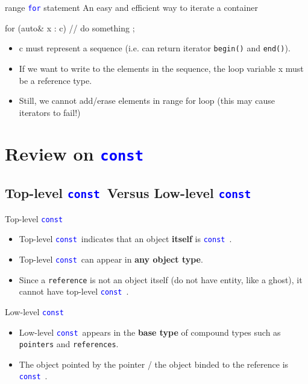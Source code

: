 \documentclass{beamer}
\newcommand{\blue}[1]{\textcolor{blue}{#1}}
\renewcommand{\bf}[1]{\textbf{#1}}
\newcommand{\ttt}[1]{\texttt{#1}}
\newcommand{\bluett}[1]{\blue{\ttt{#1}}}
\newcommand{\const}{\bluett{const}~}
\begin{document}
\begin{frame}[fragile]{range \bluett{for} statement}
    An easy and efficient way to iterate a container\\
    \begin{cpp}
for (auto& x : c) {
    // do something
};
    \end{cpp}
    \begin{itemize}
        \item c must represent a sequence (i.e. can return iterator \ttt{begin()} and \ttt{end()}).
        \item If we want to write to the elements in the sequence, the loop variable x must be a reference type.
        \item Still, we cannot add/erase elements in range for loop (this may cause iterators to fail!)
    \end{itemize}
\end{frame}

\section{Review on \const}

\subsection{Top-level \const Versus Low-level \const}

\begin{frame}{Top-level \const}
    \begin{itemize}
        \item Top-level \const indicates that an object \bf{itself} is \const.
        \item Top-level \const can appear in \bf{any object type}.
        \item Since a \ttt{reference} is not an object itself (do not have entity, like a ghost), it cannot have top-level \const.
    \end{itemize}
\end{frame}

\begin{frame}{Low-level \const}
    \begin{itemize}
        \item Low-level \const appears in the \bf{base type} of compound types such as \ttt{pointers} and \ttt{references}.
        \item The object pointed by the pointer / the object binded to the reference is \const.
    \end{itemize}
\end{frame}
\end{document}
